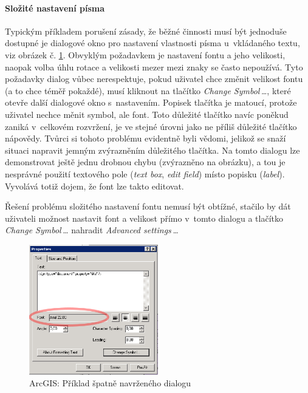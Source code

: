 \documentclass[a4paper,12pt,draft]{article}
\begin{document}
\paragraph*{Složité nastavení písma}  Typickým příkladem porušení
zásady, že běžné činnosti musí být jednoduše dostupné je dialogové
okno pro nastavení vlastnosti písma u~vkládaného textu, viz obrázek
č. \ref{fig:ArcGIS_text_dialog}. Obvyklým požadavkem je nastavení
fontu a jeho velikosti, naopak volba úhlu rotace a velikosti mezer mezi
znaky se často nepoužívá. Tyto požadavky dialog vůbec nerespektuje,
pokud uživatel chce změnit velikost fontu (a to chce téměř pokaždé),
musí kliknout na tlačítko \emph{Change Symbol\,\ldots}, které otevře
další dialogové okno s~nastavením. Popisek tlačítka je matoucí,
protože uživatel nechce měnit symbol, ale font. Toto důležité
tlačítko navíc poněkud zaniká v~celkovém rozvržení, je ve stejné
úrovni jako ne příliš důležité tlačítko nápovědy. Tvůrci si
tohoto problému evidentně byli vědomi, jelikož se snaží situaci
napravit jemným zvýrazněním důležitého tlačítka. Na tomto dialogu
lze demonstrovat ještě jednu drobnou chybu (zvýrazněno na obrázku),
a tou je nesprávné použití textového pole (\emph{text box}, \emph{edit field})
místo
popisku (\emph{label}). Vyvolává totiž dojem, že font lze takto editovat.

Řešení problému složitého nastavení fontu nemusí být obtížné,
stačilo by dát uživateli možnost nastavit font a velikost přímo
v~tomto dialogu a tlačítko \emph{Change Symbol\,\ldots} nahradit \emph{Advanced
settings\,\ldots}

\begin{figure}[h!]
    \centering
    \includegraphics[width=0.5\textwidth]{./GUI_screenshots/ArcGIS_text_dialog.png}
    \caption{ArcGIS: Příklad špatně navrženého dialogu}
    \label{fig:ArcGIS_text_dialog}
\end{figure}
\end{document}
